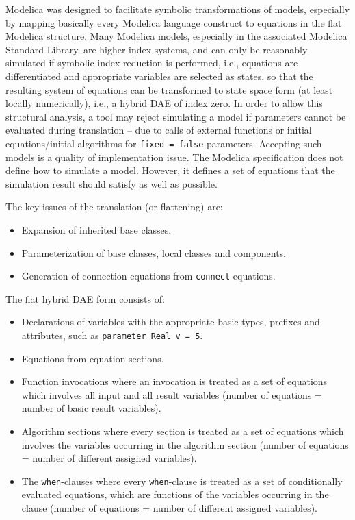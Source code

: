 Modelica was designed to facilitate symbolic transformations of models, especially by mapping basically every Modelica language construct to equations in the flat Modelica structure.
Many Modelica models, especially in the associated Modelica Standard Library, are higher index systems, and can only be reasonably simulated if symbolic index reduction is performed, i.e., equations are differentiated and appropriate variables are selected as states, so that the resulting system of equations can be transformed to state space form (at least locally numerically), i.e., a hybrid DAE of index zero.
In order to allow this structural analysis, a tool may reject simulating a model if parameters cannot be evaluated during translation -- due to calls of external functions or initial equations/initial algorithms for \lstinline!fixed = false! parameters.
Accepting such models is a quality of implementation issue.
The Modelica specification does not define how to simulate a model.
However, it defines a set of equations that the simulation result should satisfy as well as possible.

The key issues of the translation (or flattening) are:
\begin{itemize}
\item
  Expansion of inherited base classes.
\item
  Parameterization of base classes, local classes and components.
\item
  Generation of connection equations from \lstinline!connect!-equations.
\end{itemize}

The flat hybrid DAE form consists of:
\begin{itemize}
\item
  Declarations of variables with the appropriate basic types, prefixes and attributes, such as \lstinline!parameter Real v = 5!.
\item
  Equations from equation sections.
\item
  Function invocations where an invocation is treated as a set of equations which involves all input and all result variables (number of equations = number of basic result variables).
\item
  Algorithm sections where every section is treated as a set of equations which involves the variables occurring in the algorithm section (number of equations = number of different assigned variables).
\item
  The \lstinline!when!-clauses where every \lstinline!when!-clause is treated as a set of conditionally evaluated equations, which are functions of the variables occurring in the clause (number of equations = number of different assigned variables).
\end{itemize}

